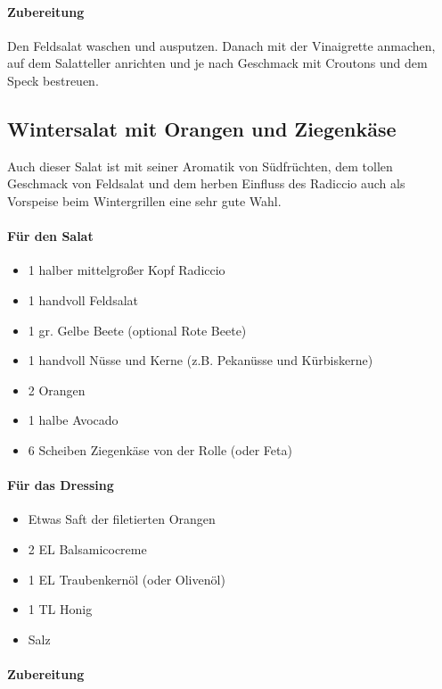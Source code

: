 \paragraph{Zubereitung}

Den Feldsalat waschen und ausputzen. Danach mit der Vinaigrette anmachen, auf dem Salatteller anrichten
und je nach Geschmack mit Croutons und dem Speck bestreuen.  

\subsection{Wintersalat mit Orangen und Ziegenkäse}
Auch dieser Salat ist mit seiner Aromatik von Südfrüchten, dem tollen Geschmack von Feldsalat und dem herben Einfluss des Radiccio
auch als Vorspeise beim Wintergrillen eine sehr gute Wahl.

\paragraph{Für den Salat}

\begin{itemize}[noitemsep]
	\item 1 halber mittelgroßer Kopf Radiccio
	\item 1 handvoll Feldsalat
	\item 1 gr. Gelbe Beete (optional Rote Beete)
	\item 1 handvoll Nüsse und Kerne (z.B. Pekanüsse und Kürbiskerne)
	\item 2 Orangen
	\item 1 halbe Avocado
	\item 6 Scheiben Ziegenkäse von der Rolle (oder Feta)
\end{itemize}	

\paragraph{Für das Dressing}

\begin{itemize}[noitemsep]
	\item Etwas Saft der filetierten Orangen
	\item 2 EL Balsamicocreme
	\item 1 EL Traubenkernöl (oder Olivenöl)
	\item 1 TL Honig
	\item  Salz
\end{itemize}

\paragraph{Zubereitung}

